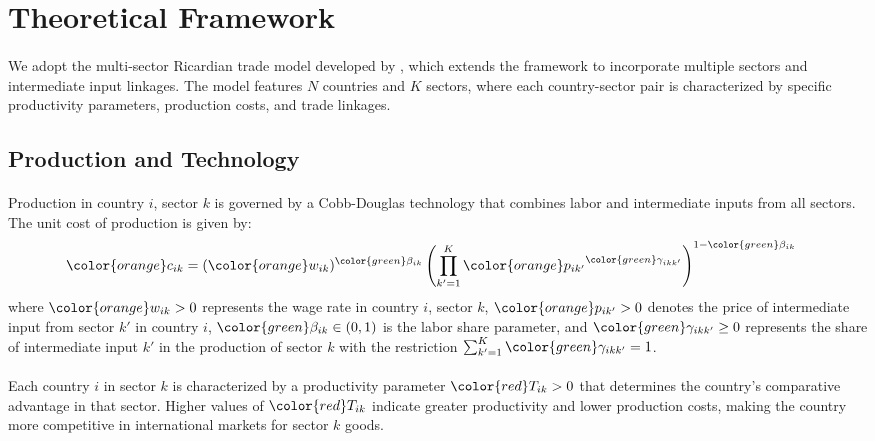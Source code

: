 \section{Theoretical Framework}

\paragraph{} We adopt the multi-sector Ricardian trade model developed by \cite{costinot2012TheReviewofEconomicStudies}, which extends the \cite{eaton2002Econometrica} framework to incorporate multiple sectors and intermediate input linkages. The model features $N$ countries and $K$ sectors, where each country-sector pair is characterized by specific productivity parameters, production costs, and trade linkages.

\subsection{Production and Technology}

\paragraph{} Production in country $i$, sector $k$ is governed by a Cobb-Douglas technology that combines labor and intermediate inputs from all sectors. The unit cost of production is given by:
\begin{align*}
    {\color{orange}c_{ik}} &= ({\color{orange}w_{ik}})^{{\color{green}\beta_{ik}}} \left(\prod_{k'=1}^{K} {\color{orange}p_{ik'}}^{{\color{green}\gamma_{ikk'}}}\right)^{1 - {\color{green}\beta_{ik}}}
\end{align*}
where ${\color{orange}w_{ik}} > 0$ represents the wage rate in country $i$, sector $k$, ${\color{orange}p_{ik'}} > 0$ denotes the price of intermediate input from sector $k'$ in country $i$, ${\color{green}\beta_{ik}} \in (0,1)$ is the labor share parameter, and ${\color{green}\gamma_{ikk'}} \geq 0$ represents the share of intermediate input $k'$ in the production of sector $k$ with the restriction $\sum_{k'=1}^{K} {\color{green}\gamma_{ikk'}} = 1$.

\paragraph{} Each country $i$ in sector $k$ is characterized by a productivity parameter ${\color{red}T_{ik}} > 0$ that determines the country's comparative advantage in that sector. Higher values of ${\color{red}T_{ik}}$ indicate greater productivity and lower production costs, making the country more competitive in international markets for sector $k$ goods.

